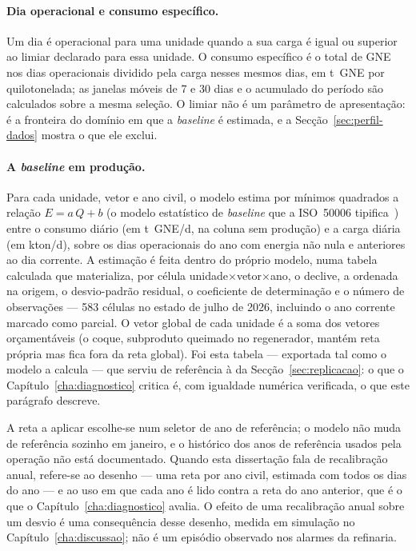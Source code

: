 \paragraph{Dia operacional e consumo específico.} Um dia é operacional
para uma unidade quando a sua carga é igual ou superior ao limiar declarado
para essa unidade. O consumo específico é o total de GNE nos dias
operacionais dividido pela carga nesses mesmos dias, em t~GNE por
quilotonelada; as janelas móveis de 7 e 30 dias e o acumulado do período
são calculados sobre a mesma seleção. O limiar não é
um parâmetro de apresentação: é a fronteira do domínio em que a
\emph{baseline} é estimada,
e a Secção~\ref{sec:perfil-dados} mostra o que ele exclui.

\paragraph{A \emph{baseline} em produção.} Para cada unidade, vetor e ano
civil, o modelo estima por mínimos quadrados a relação
$E = a\,Q + b$ (o modelo estatístico de \emph{baseline} que a ISO~50006
tipifica~\cite{ISO50006_2014}) entre o consumo diário (em t~GNE/d, na coluna sem
produção) e a carga diária (em kton/d), sobre os dias operacionais do ano
com energia não nula e anteriores ao dia corrente. A estimação é feita
dentro do próprio modelo, numa tabela calculada que materializa, por
célula unidade$\times$vetor$\times$ano, o declive, a ordenada na origem,
o desvio-padrão residual, o coeficiente de determinação e o número de
observações --- 583 células no estado de julho de 2026, incluindo o ano
corrente marcado como parcial. O vetor global de cada unidade é a soma
dos vetores orçamentáveis (o coque, subproduto queimado no regenerador,
mantém reta própria mas fica fora da reta global). Foi esta tabela ---
exportada tal como o modelo a calcula --- que serviu de referência à  da Secção~\ref{sec:replicacao}: o que o
Capítulo~\ref{cha:diagnostico} critica é, com igualdade numérica
verificada, o que este parágrafo descreve.

A reta a aplicar escolhe-se num seletor de ano de referência; o modelo não
muda de referência sozinho em janeiro, e o histórico dos anos de referência
usados pela operação não está documentado. Quando esta dissertação fala de
recalibração anual, refere-se ao desenho --- uma reta por ano civil, estimada
com todos os dias do ano --- e ao uso em que cada ano é lido contra a reta do
ano anterior, que é o que o Capítulo~\ref{cha:diagnostico} avalia. O efeito
de uma recalibração anual sobre um desvio é uma consequência desse desenho,
medida em simulação no Capítulo~\ref{cha:discussao}; não é um episódio
observado nos alarmes da refinaria.

